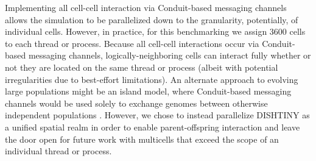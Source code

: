 Implementing all cell-cell interaction via Conduit-based messaging channels allows the simulation to be parallelized down to the granularity, potentially, of individual cells.
However, in practice, for this benchmarking we assign 3600 cells to each thread or process.
Because all cell-cell interactions occur via Conduit-based messaging channels, logically-neighboring cells can interact fully whether or not they are located on the same thread or process (albeit with potential irregularities due to best-effort limitations).
An alternate approach to evolving large populations might be an island model, where Conduit-based messaging channels would be used solely to exchange genomes between otherwise independent populations \citep{bennett1999building}.
However, we chose to instead parallelize DISHTINY as a unified spatial realm in order to enable parent-offspring interaction and leave the door open for future work with multicells that exceed the scope of an individual thread or process.
